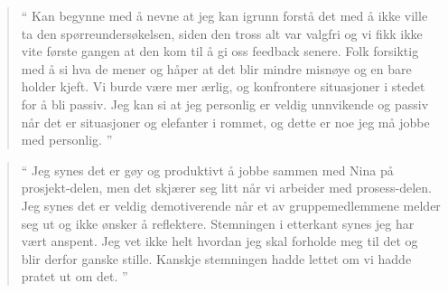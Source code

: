 \begin{quote}``
Kan begynne med å nevne at jeg kan igrunn forstå det med å ikke ville ta den spørreundersøkelsen, siden den 
tross alt var valgfri og vi fikk ikke vite første gangen at den kom til å gi oss feedback senere. Folk forsiktig med å si 
hva de mener og håper at det blir mindre misnøye og en bare holder kjeft. Vi burde være mer ærlig, og konfrontere 
situasjoner i stedet for å bli passiv. Jeg kan si at jeg personlig er veldig unnvikende og passiv når det er situasjoner 
og elefanter i rommet, og dette er noe jeg må jobbe med personlig.
''\end{quote} 

\begin{quote}``
Jeg synes det er gøy og produktivt å jobbe sammen med Nina på prosjekt-delen, men det skjærer seg litt når vi 
arbeider med prosess-delen. Jeg synes det er veldig demotiverende når et av gruppemedlemmene melder seg ut 
og ikke ønsker å reflektere. Stemningen i etterkant synes jeg har vært anspent. Jeg vet ikke helt hvordan jeg skal 
forholde meg til det og blir derfor ganske stille. Kanskje stemningen hadde lettet om vi hadde pratet ut om det.
''\end{quote} 

